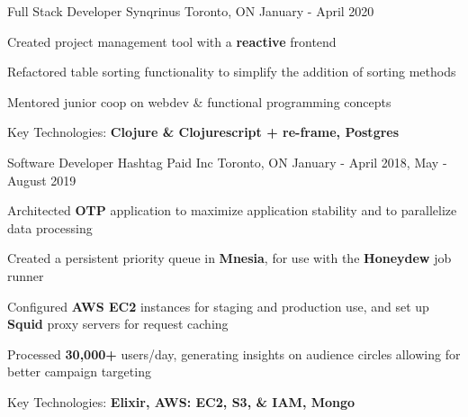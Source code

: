 

\begin{cventries}

  \cventry
    {Full Stack Developer} %
    {Synqrinus} %
    {Toronto, ON} %
    {January - April 2020} %
    {
      \begin{cvitems} %
        \item {Created project management tool with a \textbf{reactive} frontend}
        \item {Refactored table sorting functionality to simplify the addition of sorting methods}
        \item {Mentored junior coop on webdev \& functional programming concepts}
        \item {Key Technologies: \textbf{Clojure \& Clojurescript + re-frame, Postgres}}
      \end{cvitems}
    }

  \cventry
    {Software Developer} %
    {Hashtag Paid Inc} %
    {Toronto, ON} %
    {January - April 2018, May - August 2019} %
    {
      \begin{cvitems} %
        \item {Architected \textbf{OTP} application to maximize application stability and to parallelize data processing}
        \item {Created a persistent priority queue in \textbf{Mnesia}, for use with the \textbf{Honeydew} job runner}
        \item {Configured \textbf{AWS EC2} instances for staging and production use, and set up \textbf{Squid} proxy servers for request caching}
        \item {Processed \textbf{30,000+} users/day, generating insights on audience circles allowing for better campaign targeting}
        \item {Key Technologies: \textbf{Elixir, AWS: EC2, S3, \& IAM, Mongo}}
      \end{cvitems}
    }


\end{cventries}
